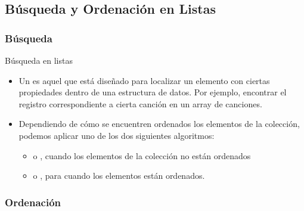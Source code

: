 \documentclass[10pt,envcountsect,spanish]{beamer}
\begin{document}
\subsection{Búsqueda y Ordenación en Listas}


\subsubsection{Búsqueda}

\begin{frame}{Búsqueda en listas}

\begin{itemize}
\item Un  es aquel que está diseñado para localizar un elemento con ciertas propiedades dentro de una estructura de datos. Por ejemplo, encontrar el registro correspondiente a cierta canción en un array de canciones.


\item Dependiendo de cómo se encuentren ordenados los elementos de la colección, podemos aplicar uno de los dos siguientes algoritmos: 

\begin{itemize}
\item o , cuando los elementos de la colección no están ordenados
\item o , para cuando los elementos están ordenados.
\end{itemize}

\end{itemize}

\end{frame}




\subsubsection{Ordenación}
\end{document}
